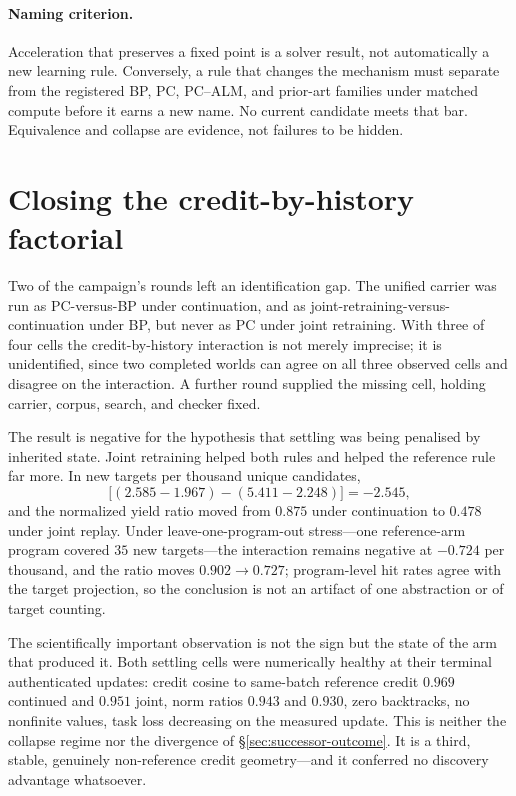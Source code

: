 \documentclass[11pt]{article}
\begin{document}
\paragraph{Naming criterion.}
Acceleration that preserves a fixed point is a solver result, not automatically a new
learning rule. Conversely, a rule that changes the mechanism must separate from the
registered BP, PC, PC--ALM, and prior-art families under matched compute before it earns a
new name. No current candidate meets that bar. Equivalence and collapse are evidence,
not failures to be hidden.

\section{Closing the credit-by-history factorial}
\label{sec:credit-history-factorial}

Two of the campaign's rounds left an identification gap. The unified carrier was run as
PC-versus-BP under continuation, and as joint-retraining-versus-continuation under BP, but
never as PC under joint retraining. With three of four cells the credit-by-history
interaction is not merely imprecise; it is unidentified, since two completed worlds can
agree on all three observed cells and disagree on the interaction. A further round
supplied the missing cell, holding carrier, corpus, search, and checker fixed.

The result is negative for the hypothesis that settling was being penalised by inherited
state. Joint retraining helped both rules and helped the reference rule far more. In new
targets per thousand unique candidates,
\[
  \bigl[(2.585-1.967)-(5.411-2.248)\bigr]=-2.545 ,
\]
and the normalized yield ratio moved from $0.875$ under continuation to $0.478$ under
joint replay. Under leave-one-program-out stress---one reference-arm program covered $35$
new targets---the interaction remains negative at $-0.724$ per thousand, and the ratio
moves $0.902\to0.727$; program-level hit rates agree with the target projection, so the
conclusion is not an artifact of one abstraction or of target counting.

The scientifically important observation is not the sign but the state of the arm that
produced it. Both settling cells were numerically healthy at their terminal authenticated
updates: credit cosine to same-batch reference credit $0.969$ continued and $0.951$ joint,
norm ratios $0.943$ and $0.930$, zero backtracks, no nonfinite values, task loss
decreasing on the measured update. This is neither the collapse regime nor the divergence
of \S\ref{sec:successor-outcome}. It is a third, stable, genuinely non-reference credit
geometry---and it conferred no discovery advantage whatsoever.
\end{document}
